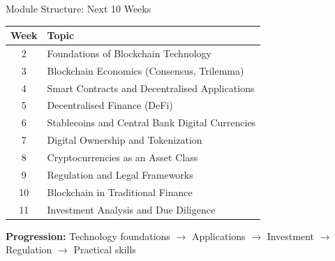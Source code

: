 \documentclass[10pt]{beamer}
\begin{document}
\begin{frame}{Module Structure: Next 10 Weeks}
  \begin{center}
  \small
  \begin{tabular}{cl}
    \toprule
    \textbf{Week} & \textbf{Topic} \\
    \midrule
    2 & Foundations of Blockchain Technology \\
    3 & Blockchain Economics (Consensus, Trilemma) \\
    4 & Smart Contracts and Decentralised Applications \\
    5 & Decentralised Finance (DeFi) \\
    6 & Stablecoins and Central Bank Digital Currencies \\
    7 & Digital Ownership and Tokenization \\
    8 & Cryptocurrencies as an Asset Class \\
    9 & Regulation and Legal Frameworks \\
    10 & Blockchain in Traditional Finance \\
    11 & Investment Analysis and Due Diligence \\
    \bottomrule
  \end{tabular}
  \end{center}
  
  \vspace{0.5em}
  \textbf{Progression:} Technology foundations $\rightarrow$ Applications $\rightarrow$ Investment $\rightarrow$ Regulation $\rightarrow$ Practical skills
\end{frame}
\end{document}
